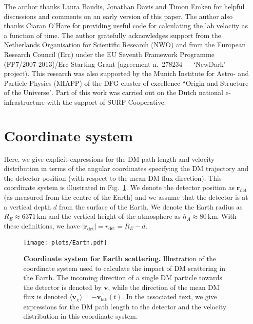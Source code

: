 \documentclass[prd,twocolumn,showpacs,nofootinbib,aps]{revtex4-1}
\begin{document}


\acknowledgements

The author thanks Laura Baudis, Jonathan Davis and Timon Emken for helpful discussions and comments on an early version of this paper. The author also thanks Ciaran O'Hare for providing useful code for calculating the lab velocity as a function of time. The author gratefully acknowledges support from the Netherlands Organisation for Scientific Research (NWO) and from the European Research Council ({\sc Erc}) under the EU Seventh Framework Programme (FP7/2007-2013)/{\sc Erc} Starting Grant (agreement n.\ 278234 --- `{\sc NewDark}' project).
This research was also supported by the Munich Institute for Astro- and Particle Physics (MIAPP) of the DFG cluster of excellence ``Origin and Structure of the Universe".
Part of this work was carried out on the Dutch national e-infrastructure with the support of SURF Cooperative.

\appendix

\section{Coordinate system}
\label{app:coordinates}
Here, we give explicit expressions for the DM path length and velocity distribution in terms of the angular coordinates specifying the DM trajectory and the detector position (with respect to the mean DM flux direction). This coordinate system is illustrated in Fig.~\ref{fig:earth}. We denote the detector position as $\mathbf{r}_\mathrm{det}$ (as measured from the centre of the Earth) and we assume that the detector is at a vertical depth $d$ from the surface of the Earth. We denote the Earth radius as $R_E \approx 6371\,\mathrm{km}$ and the vertical height of the atmosphere as $h_A \approx 80 \,\mathrm{km}$. With these definitions, we have $|\mathbf{r}_\mathrm{det}| = r_\mathrm{det}= R_E - d$. 

\begin{figure}[t!]
\centering
\texttt{[image: plots/Earth.pdf]}
\caption{\textbf{Coordinate system for Earth scattering.} Illustration of the coordinate system used to calculate the impact of DM scattering in the Earth. The incoming direction of a single DM particle towards the detector is denoted by $\mathbf{v}$, while the direction of the mean DM flux is denoted $\langle \mathbf{v}_\chi\rangle = -\mathbf{v}_\mathrm{lab}(t)$. In the associated text, we give expressions for the DM path length to the detector and the velocity distribution in this coordinate system.}
\label{fig:earth}
\end{figure}
\end{document}
